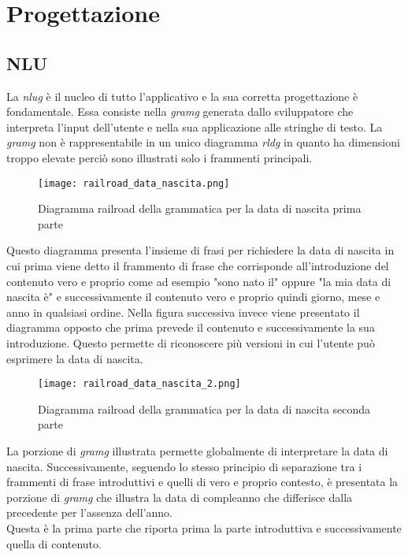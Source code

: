 \section{Progettazione}
	\subsection{NLU}
	La \emph{\gls{nlug}} è il nucleo di tutto l'applicativo e la sua corretta progettazione è fondamentale. Essa consiste nella \emph{\gls{gramg}} generata dallo sviluppatore che interpreta l'input dell'utente e nella sua applicazione alle stringhe di testo. La \emph{\gls{gramg}} non è rappresentabile in un unico diagramma \emph{\gls{rldg}} in quanto ha dimensioni troppo elevate perciò sono illustrati solo i frammenti principali.
	
	\begin{figure}[htbp]
		\begin{center}
			\texttt{[image: railroad\_data\_nascita.png]}
			\caption{Diagramma railroad della grammatica per la data di nascita prima parte}
		\end{center}
	\end{figure}
	
	Questo diagramma presenta l'insieme di frasi per richiedere la data di nascita in cui prima viene detto il frammento di frase che corrisponde all'introduzione del contenuto vero e proprio come ad esempio "sono nato il" oppure "la mia data di nascita è" e successivamente il contenuto vero e proprio quindi giorno, mese e anno in qualsiasi ordine. Nella figura successiva invece viene presentato il diagramma opposto che prima prevede il contenuto e successivamente la sua introduzione. Questo permette di riconoscere più versioni in cui l'utente può esprimere la data di nascita.
	
	\begin{figure}[htbp]
		\begin{center}
			\texttt{[image: railroad\_data\_nascita\_2.png]}
			\caption{Diagramma railroad della grammatica per la data di nascita seconda parte}
		\end{center}
	\end{figure}

	La porzione di \emph{\gls{gramg}} illustrata permette globalmente di interpretare la data di nascita. Successivamente, seguendo lo stesso principio di separazione tra i frammenti di frase introduttivi e quelli di vero e proprio contesto, è presentata la porzione di \emph{\gls{gramg}} che illustra la data di compleanno che differisce dalla precedente per l'assenza dell'anno. \\
	Questa è la prima parte che riporta prima la parte introduttiva e successivamente quella di contenuto.
	
